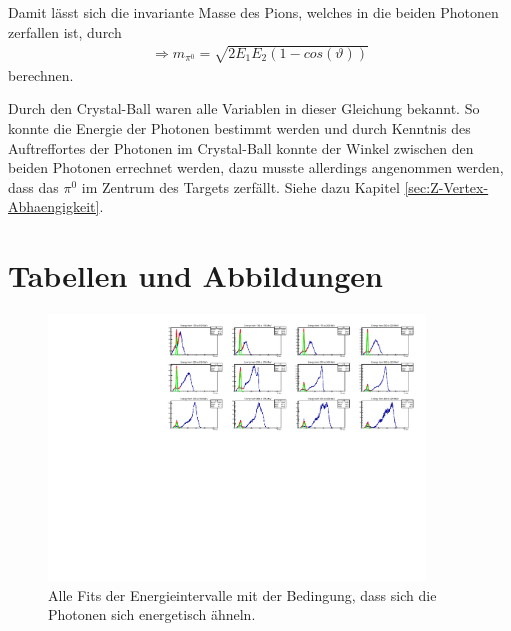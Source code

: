 \documentclass[a4paper,11pt,oneside,final,german,openbib,pdftex]{scrbook}
\begin{document}
{\begin{appendix}
Damit lässt sich die invariante Masse des Pions, welches in die beiden Photonen zerfallen ist, durch
\begin{equation}
\begin{split}
\Rightarrow{m_{\pi^0}=\sqrt{2E_1E_2(1-cos(\vartheta))}}
\label{eq:Formel-zur-Berechnung-der-Invariante-Masse-Herleitung}
\end{split}
\end{equation}
berechnen.

Durch den Crystal-Ball waren alle Variablen in dieser Gleichung bekannt. So konnte die Energie der Photonen bestimmt werden und durch Kenntnis des Auftreffortes der Photonen im Crystal-Ball konnte der Winkel zwischen den beiden Photonen errechnet werden, dazu musste allerdings angenommen werden, dass das $\pi^0$ im Zentrum des Targets zerfällt. Siehe dazu Kapitel \ref{sec:Z-Vertex-Abhaengigkeit}.

\section{Tabellen und Abbildungen}


\begin{figure}[h!]
	\begin{center}
		\includegraphics[width=100mm]{RealDataEnergyIntervalSymmetricPhotonsAllFits}
		\caption{Alle Fits der Energieintervalle mit der Bedingung, dass sich die Photonen sich energetisch ähneln.}
		\label{fig:similarenergyallfits}
	\end{center}
\end{figure}


\end{appendix}}
\end{document}
